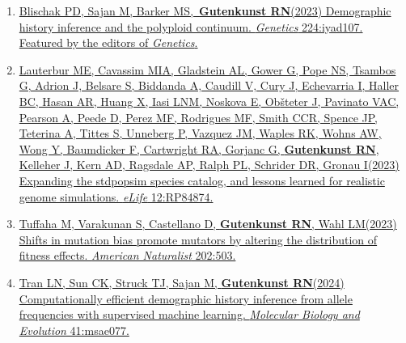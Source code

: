 \documentclass[11pt]{article}
\begin{document}
\begin{enumerate}
\item \href{https://doi.org/10.1093/genetics/iyad107}{Blischak PD\trainee\corresponding, Sajan M\trainee, Barker MS, \textbf{Gutenkunst RN}\corresponding (2023) Demographic history inference and the polyploid continuum. \emph{Genetics} 224:iyad107.}\\
 \href{https://academic.oup.com/genetics/issue/224/4}{Featured by the editors of \emph{Genetics}.}

\item \href{https://doi.org/10.7554/eLife.84874}{Lauterbur ME\equal, Cavassim MIA\equal, Gladstein AL\equal, Gower G\equal, Pope NS\equal, Tsambos G\equal, Adrion J, Belsare S, Biddanda A, Caudill V, Cury J, Echevarria I, Haller BC, Hasan AR, Huang X, Iasi LNM, Noskova E, Ob{\v s}teter J, Pavinato VAC, Pearson A, Peede D, Perez MF, Rodrigues MF, Smith CCR, Spence JP, Teterina A, Tittes S, Unneberg P, Vazquez JM, Waples RK, Wohns AW, Wong Y, Baumdicker F, Cartwright RA, Gorjanc G, \textbf{Gutenkunst RN}, Kelleher J, Kern AD, Ragsdale AP, Ralph PL, Schrider DR, Gronau I\corresponding (2023) Expanding the stdpopsim species catalog, and lessons learned for realistic genome simulations. \emph{eLife} 12:RP84874.}

\item \href{https://doi.org/10.1086/726010}{Tuffaha M, Varakunan S, Castellano D\trainee, \textbf{Gutenkunst RN}, Wahl LM\corresponding (2023) Shifts in mutation bias promote mutators by altering the distribution of fitness effects. \emph{American Naturalist} 202:503.}

\item \href{https://doi.org/10.1093/molbev/msae077}{Tran LN\trainee, Sun CK\trainee, Struck TJ\trainee, Sajan M\trainee, \textbf{Gutenkunst RN}\corresponding (2024) Computationally efficient demographic history inference from allele frequencies with supervised machine learning. \emph{Molecular Biology and Evolution} 41:msae077.}

\end{enumerate}
\end{document}
